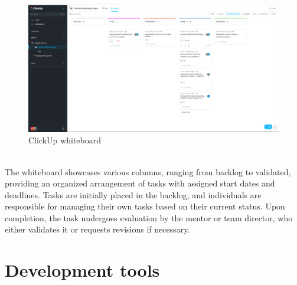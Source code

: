 \documentclass[12pt]{book}
\begin{document}
\begin{figure}[!h]
    \centering
    \includegraphics[scale=0.35]{./Figures/Images/ClickUp whiteboard.png}
    \caption{ClickUp whiteboard}
    \label{ClickUp whiteboard}
\end{figure}\\
The whiteboard showcases various columns, ranging from backlog to validated, providing an organized arrangement of tasks with assigned start dates and deadlines. Tasks are initially placed in the backlog, and individuals are responsible for managing their own tasks based on their current status. Upon completion, the task undergoes evaluation by the mentor or team director, who either validates it or requests revisions if necessary.
\newpage

\section{Development tools}
\end{document}

